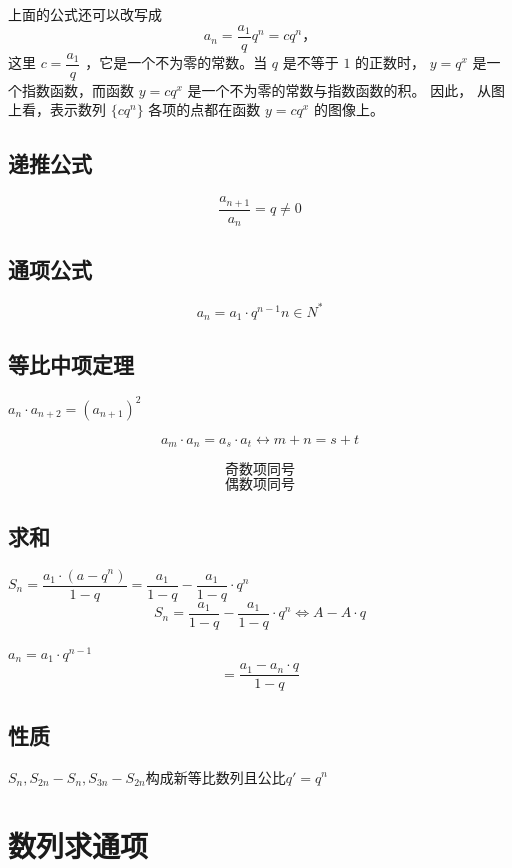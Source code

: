 \documentclass[10pt,cn]{elegantbook}
\begin{document}
      上面的公式还可以改写成
      $$ a_n = \dfrac{a_1}{q} q^n = c q^n \text{，}$$
      这里 $c = \dfrac{a_1}{q}$ ，它是一个不为零的常数。当 $q$ 是不等于 $1$ 的正数时，
      $y = q^x$ 是一个指数函数，而函数 $y = c q^x$ 是一个不为零的常数与指数函数的积。
      因此， 从图上看，表示数列 $\{c q^n\}$ 各项的点都在函数 $y = c q^x$ 的图像上。
      
      \subsection{递推公式}
      
      $$\dfrac{a_{n+1}}{a_{n}}=q \neq 0$$
      
       \subsection{通项公式}
       
       $$a_{n}=a_{1} \cdot q^{n-1} n \in N^{*}$$
       
        \subsection{等比中项定理}
        
        $a_{n} \cdot a_{n+2}=(a_{n+1})^{2}$
        
        $$a_{m}\cdot a_{n}= a_{s} \cdot a_{t} \leftrightarrow m+n=s+t$$
        
        $$\text{奇数项同号}$$
        $$\text{偶数项同号}$$
        
        \subsection{求和}
        
        $S_{n}=\dfrac{a_{1}\cdot (a-q^{n})}{1-q}=\dfrac{a_{1}}{1-q}-\dfrac{a_{1}}{1-q} \cdot q^{n}$
        $$S_{n}=\dfrac{a_{1}}{1-q}-\dfrac{a_{1}}{1-q} \cdot q^{n} \Leftrightarrow A-A\cdot q$$
        
        $a_{n}=a_{1}\cdot q^{n-1}$
        $$ =\dfrac{a_{1}-a_{n}\cdot q}{1-q}$$
        
        \subsection{性质}
        
        $S_{n},S_{2n}-S_{n},S_{3n}-S_{2n}$构成新等比数列且公比$q'=q^{n}$
        
        \section{数列求通项}
        
\end{document}

